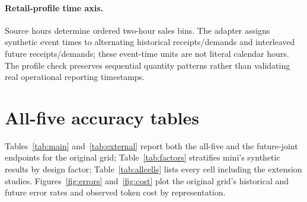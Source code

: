 \paragraph{Retail-profile time axis.}
Source hours determine ordered two-hour sales bins. The adapter assigns synthetic
event times to alternating historical receipts/demands and interleaved future
receipts/demands; these event-time units are not literal calendar hours. The
profile check preserves sequential quantity patterns rather than validating
real operational reporting timestamps.

\section{All-five accuracy tables}
\label{app:tables}
Tables~\ref{tab:main} and~\ref{tab:external} report both the all-five and the
future-joint endpoints for the original grid; Table~\ref{tab:factors} stratifies mini's
synthetic results by design factor; Table~\ref{tab:allcells} lists every cell including
the extension studies. Figures~\ref{fig:errors} and~\ref{fig:cost} plot the original
grid's historical and future error rates and observed token cost by representation.





